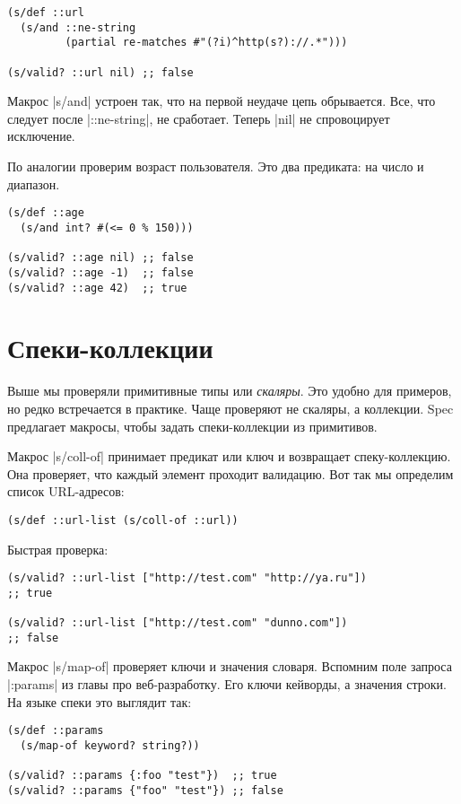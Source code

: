 \begin{verbatim}
(s/def ::url
  (s/and ::ne-string
         (partial re-matches #"(?i)^http(s?)://.*")))

(s/valid? ::url nil) ;; false
\end{verbatim}

Макрос \spverb|s/and| устроен так, что на первой неудаче цепь обрывается. Все,
что следует после \spverb|::ne-string|, не сработает. Теперь \spverb|nil| не
спровоцирует исключение.

По аналогии проверим возраст пользователя. Это два предиката: на число и
диапазон.

\begin{verbatim}
(s/def ::age
  (s/and int? #(<= 0 % 150)))

(s/valid? ::age nil) ;; false
(s/valid? ::age -1)  ;; false
(s/valid? ::age 42)  ;; true
\end{verbatim}

\section{Спеки-коллекции}

Выше мы проверяли примитивные типы или \emph{скаляры}. Это удобно для примеров,
но редко встречается в практике. Чаще проверяют не скаляры, а коллекции. Spec
предлагает макросы, чтобы задать спеки-коллекции из примитивов.

Макрос \spverb|s/coll-of| принимает предикат или ключ и возвращает
спеку-коллекцию. Она проверяет, что каждый элемент проходит валидацию. Вот так
мы определим список URL-адресов:

\begin{verbatim}
(s/def ::url-list (s/coll-of ::url))
\end{verbatim}

\noindent
Быстрая проверка:

\begin{verbatim}
(s/valid? ::url-list ["http://test.com" "http://ya.ru"])
;; true

(s/valid? ::url-list ["http://test.com" "dunno.com"])
;; false
\end{verbatim}


Макрос \spverb|s/map-of| проверяет ключи и значения словаря. Вспомним поле
запроса \spverb|:params| из главы про веб-разработку. Его ключи кейворды, а
значения строки. На языке спеки это выглядит так:

\begin{verbatim}
(s/def ::params
  (s/map-of keyword? string?))

(s/valid? ::params {:foo "test"})  ;; true
(s/valid? ::params {"foo" "test"}) ;; false
\end{verbatim}


